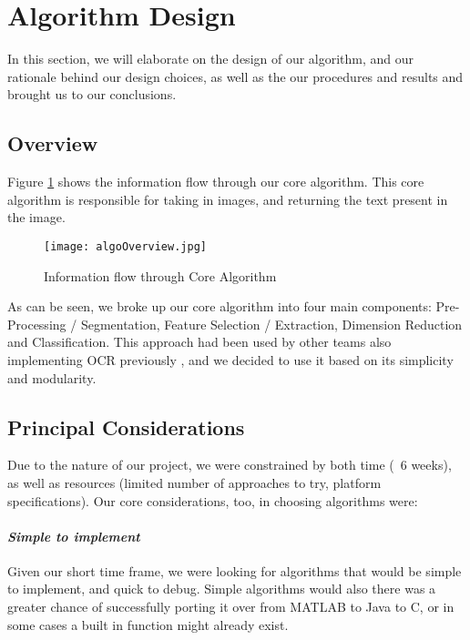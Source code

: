 \section{Algorithm Design}
In this section, we will elaborate on the design of our algorithm, and our rationale behind our design choices,
as well as the our procedures and results and brought us to our conclusions.

\subsection{Overview}
Figure \ref{fig:algoOverview} shows the information flow through our core algorithm. This core
algorithm is responsible for taking in images, and returning the text present in the image.
	\begin{figure}[h]
		\texttt{[image: algoOverview.jpg]}\\
		\caption{Information flow through Core Algorithm}
		\label{fig:algoOverview}
	\end{figure}
As can be seen, we broke up our core algorithm into four main components: Pre-Processing / Segmentation,
Feature Selection / Extraction, Dimension Reduction and Classification. This approach had been used by other teams
also implementing OCR previously \cite{tai, zhidong, sonia}, and we decided to use it based on its simplicity and modularity.\\





\subsection{Principal Considerations}
Due to the nature of our project, we were constrained by both time (~6 weeks), as well as resources (limited number of approaches
to try, platform specifications). Our core considerations, too, in choosing algorithms were:\\

\paragraph{\textit{Simple to implement}} Given our short time frame, we were looking for algorithms that would be simple to implement, and
quick to debug. Simple algorithms would also there was a greater chance of successfully porting it over from MATLAB to Java to C,
or in some cases a built in function might already exist.

